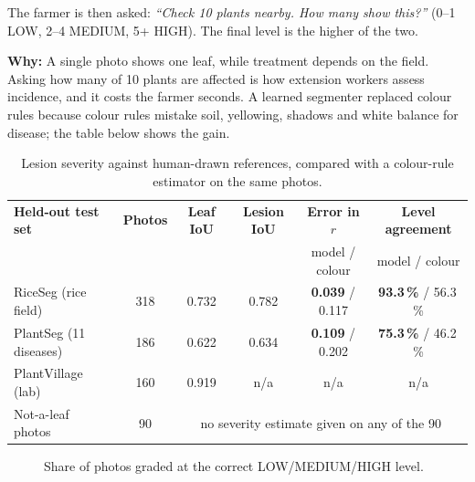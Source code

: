 \documentclass[11pt,a4paper]{article}
\newcommand{\why}[1]{\par\smallskip\noindent\colorbox{leaflight}{\parbox{\dimexpr\linewidth-2\fboxsep}{\small\textbf{\color{leaf}Why:} #1}}\par\smallskip}
\begin{document}
The farmer is then asked: \emph{``Check 10 plants nearby. How many show this?''} (0--1 LOW, 2--4 MEDIUM, 5+ HIGH). The
final level is the higher of the two.

\why{A single photo shows one leaf, while treatment depends on the field. Asking how many of 10 plants are affected is
how extension workers assess incidence, and it costs the farmer seconds. A learned segmenter replaced colour rules
because colour rules mistake soil, yellowing, shadows and white balance for disease; the table below shows the gain.}

\begin{table}[h]
\centering\small
\begin{tabular}{@{}lccccc@{}}
\toprule
\textbf{Held-out test set} & \textbf{Photos} & \textbf{Leaf IoU} & \textbf{Lesion IoU} & \textbf{Error in $r$} & \textbf{Level agreement} \\
 & & & & model / colour & model / colour \\
\midrule
RiceSeg (rice field) & 318 & 0.732 & 0.782 & \textbf{0.039} / 0.117 & \textbf{93.3\,\%} / 56.3\,\% \\
PlantSeg (11 diseases) & 186 & 0.622 & 0.634 & \textbf{0.109} / 0.202 & \textbf{75.3\,\%} / 46.2\,\% \\
PlantVillage (lab) & 160 & 0.919 & n/a & n/a & n/a \\
Not-a-leaf photos & 90 & \multicolumn{4}{c}{no severity estimate given on any of the 90} \\
\bottomrule
\end{tabular}
\caption{Lesion severity against human-drawn references, compared with a colour-rule estimator on the same photos.}
\end{table}

\begin{figure}[h]
\centering
{}
\caption{Share of photos graded at the correct LOW/MEDIUM/HIGH level.}
\end{figure}
\end{document}
